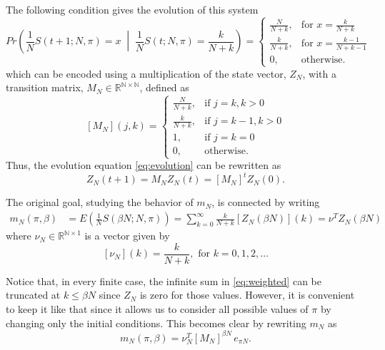 \documentclass{article}
\newcommand{\N}{\mathbb{N}}
\newcommand{\R}{\mathbb{R}}
\newcommand{\ppar}[1]{\left( #1 \right)}
\newcommand{\spar}[1]{\left[ #1 \right]}
\begin{document}
The following condition gives the evolution of this system
\begin{equation}
    Pr\ppar{\frac{1}{N} S(t+1; N, \pi) = x \;\middle|\; \frac{1}{N} S(t; N, \pi) = \frac{k}{N+k}} = 
    \begin{cases}
        \frac{N}{N+k}, &\text{for } x= \frac{k}{N+k} \\
        \frac{k}{N+k}, &\text{for } x= \frac{k-1}{N+k-1} \\
        0, &\text{otherwise.}
    \end{cases}
    \label{eq:evolution}
\end{equation}
which can be encoded using a multiplication of the state vector, $Z_N$, with a transition matrix, $M_N\in \R^{\N\times \N}$, defined as
\begin{equation}
    \spar{M_N}(j,k) = 
    \begin{cases}
        \frac{N}{N+k}, &\text{if } j= k, k>0 \\
        \frac{k}{N+k}, &\text{if } j= k-1, k>0 \\
        1, &\text{if } j= k=0 \\
        0, &\text{otherwise.}
    \end{cases}
\end{equation}
Thus, the evolution equation \eqref{eq:evolution} can be rewritten as
\begin{equation}
    Z_N(t+1) = M_N Z_N(t) = \spar{M_N}^t Z_N(0).
\end{equation}

The original goal, studying the behavior of $m_N$, is connected by writing
\begin{align}
    m_N(\pi, \beta) 
    &= 
    E\ppar{\frac{1}{N}S\ppar{\beta N; N, \pi }}
    =
    \sum_{k=0}^{\infty} \frac{k}{N+k} \spar{Z_N(\beta N)}(k)
    =
    \nu^T Z_N(\beta N)
    \label{eq:weighted}
\end{align}
where $\nu_N \in \R^{\N \times 1}$ is a vector given by
\begin{equation}
    \spar{\nu_N}(k) = \frac{k}{N+k}, \text{ for } k=0,1, 2, \dots
\end{equation}

Notice that, in every finite case, the infinite sum in \eqref{eq:weighted} can be truncated at $k\leq \beta N$ since $Z_N$ is zero for those values.
%
However, it is convenient to keep it like that since it allows us to consider all possible values of $\pi$ by changing only the initial conditions.
%
This becomes clear by rewriting $m_N$ as
\begin{equation}
    m_N(\pi, \beta) = \nu_N^T \spar{M_N}^{\beta N}\, e_{\pi N}.
    \label{eq:mat_mult_base}
\end{equation}
\end{document}
